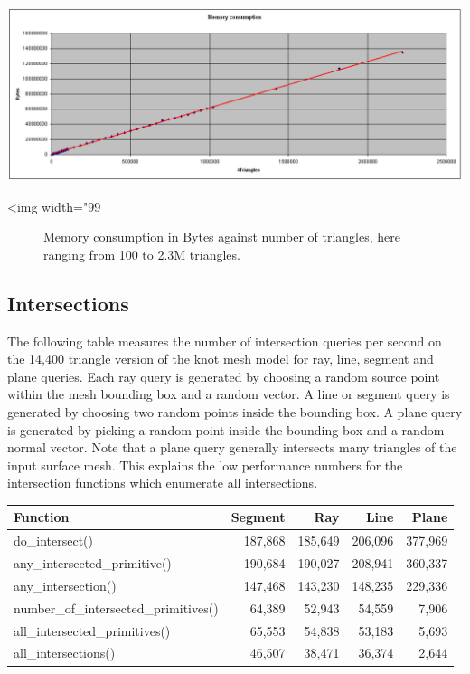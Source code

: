 \begin{center}
    \label{fig:AABB-tree-memory}
    \begin{ccTexOnly}
      \includegraphics[width=1.0\textwidth]{AABB_tree/figs/memory}
    \end{ccTexOnly}
    \begin{ccHtmlOnly}
        <img width="99%
    \end{ccHtmlOnly}
    \begin{figure}[h]
        \caption{Memory consumption in Bytes against number of triangles, here
                 ranging from 100 to 2.3M triangles.}
    \end{figure}
\end{center}



\subsection{Intersections}

The following table measures the number of intersection queries per second on the 14,400 triangle version of the knot mesh model for ray, line, segment and plane queries. Each ray query is generated by choosing a random source point within the mesh bounding box and a random vector. A line or segment query is generated by choosing two random points inside the bounding box. A plane query is generated by picking a random point inside the bounding box and a random normal vector. Note that a plane query generally intersects many triangles of the input surface mesh. This explains the low performance numbers for the intersection functions which enumerate all intersections.

\begin{tabular}{|l|r|r|r|r|}
  \hline
  Function                              & Segment &     Ray &    Line &   Plane \\
  \hline
  do\_intersect()                       & 187,868 & 185,649 & 206,096 & 377,969 \\
  any\_intersected_primitive()          & 190,684 & 190,027 & 208,941 & 360,337 \\
  any\_intersection()                   & 147,468 & 143,230 & 148,235 & 229,336 \\
  number\_of\_intersected\_primitives() &  64,389 &  52,943 &  54,559 &   7,906 \\
  all\_intersected\_primitives()        &  65,553 &  54,838 &  53,183 &   5,693 \\
  all\_intersections()                  &  46,507 &  38,471 &  36,374 &   2,644 \\
  \hline
\end{tabular}


